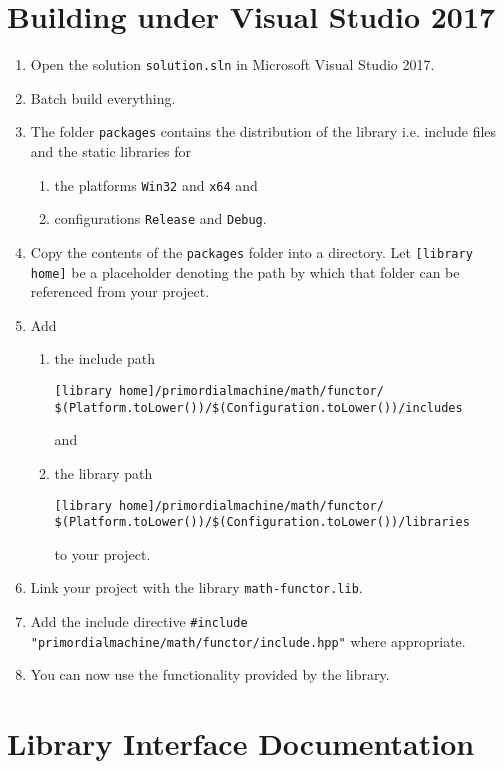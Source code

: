 \documentclass[oneside]{article}
\begin{document}
\section{Building under Visual Studio 2017}
\begin{enumerate}
\item Open the solution \texttt{solution.sln} in Microsoft Visual Studio 2017.
\item Batch build everything.
\item The folder \texttt{packages} contains the distribution of the library i.e. include files and the
      static libraries for
  \begin{enumerate}
    \item the platforms \texttt{Win32} and \texttt{x64} and
    \item configurations \texttt{Release} and \texttt{Debug}.
  \end{enumerate}
\item Copy the contents of the \verb+packages+ folder into a directory. Let
      \verb+[library home]+ be a placeholder denoting the path by which that folder
      can be referenced from your project.
\item Add
  \begin{enumerate}
    \item the include path
\begin{verbatim}
[library home]/primordialmachine/math/functor/
$(Platform.toLower())/$(Configuration.toLower())/includes
\end{verbatim}
	and
    \item the library path
\begin{verbatim}
[library home]/primordialmachine/math/functor/
$(Platform.toLower())/$(Configuration.toLower())/libraries
\end{verbatim}
    to your project.
\end{enumerate}
\item Link your project with the library \verb+math-functor.lib+.
\item Add the include directive \verb+#include "primordialmachine/math/functor/include.hpp"+ where appropriate.
\item You can now use the functionality provided by the library.
\end{enumerate}

\section{Library Interface Documentation}
\end{document}
